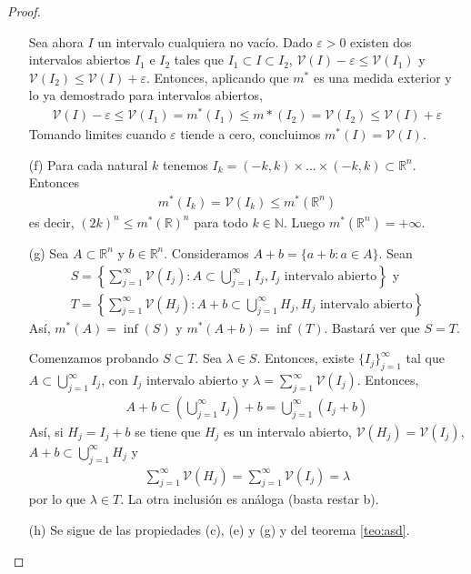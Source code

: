 \begin{proof}
\begin{enumerate}
        Sea ahora $I$ un intervalo cualquiera no vacío. Dado $\varepsilon > 0$ existen dos intervalos abiertos $I_1$ e $I_2$ tales que $I_1 \subset I \subset I_2$, $\mathcal{V}(I) - \varepsilon \leq \mathcal{V}(I_1)$ y $\mathcal{V}(I_2) \leq \mathcal{V}(I) + \varepsilon$. Entonces, aplicando que $m^*$ es una medida exterior y lo ya demostrado para intervalos abiertos,
              \begin{align*}
                  \mathcal{V}(I) - \varepsilon \leq \mathcal{V}(I_1) = m^*(I_1) \leq m*(I_2) = \mathcal{V}(I_2) \leq \mathcal{V}(I) + \varepsilon
              \end{align*}
              Tomando limites cuando $\varepsilon$ tiende a cero, concluimos $m^*(I) = \mathcal{V}(I)$.
        \item[(f)] Para cada natural $k$ tenemos $I_k = (-k,k) \times ... \times (-k,k) \subset \mathbb{R}^n$. Entonces
              \begin{align*}
                  m^*(I_k) = \mathcal{V}(I_k) \leq m^*(\mathbb{R}^n)
              \end{align*}
              es decir, $(2k)^n \leq m^*(\mathbb{R})^n$ para todo $k \in \mathbb{N}$. Luego $m^*(\mathbb{R}^n) = +\infty$.
        \item[(g)] Sea $A \subset \mathbb{R}^n$ y $b \in \mathbb{R}^n$. Consideramos $A + b = \{ a + b : a \in A\}$. Sean
              \begin{align*}
                  S = \left\{  \sum_{j=1}^{\infty}{\mathcal{V}(I_j)} : A \subset \bigcup_{j=1}^{\infty}{I_j}, I_j \text{ intervalo abierto}\right\} \text{ y } \\
                  T = \left\{  \sum_{j=1}^{\infty}{\mathcal{V}(H_j)} : A + b \subset \bigcup_{j=1}^{\infty}{H_j}, H_j \text{ intervalo abierto}\right\}
              \end{align*}
              Así, $m^*(A) = \inf(S)$ y $m^*(A + b) = \inf(T)$. Bastará ver que $S = T$.

              Comenzamos probando $S \subset T$. Sea $\lambda \in S$. Entonces, existe $\{ I_j \}_{j=1}^{\infty}$ tal que $A \subset \bigcup_{j=1}^{\infty}{I_j}$, con $I_j$ intervalo abierto y $\lambda = \sum_{j=1}^{\infty}{\mathcal{V}(I_j)}$. Entonces,
              \begin{align*}
                  A + b \subset \left( \bigcup_{j=1}^{\infty}{I_j} \right) + b =  \bigcup_{j=1}^{\infty}{(I_j + b)}
              \end{align*}
              Así, si $H_j = I_j + b$ se tiene que $H_j$ es un intervalo abierto, $\mathcal{V}(H_j) = \mathcal{V}(I_j)$, $A + b \subset \bigcup_{j=1}^{\infty}{H_j}$ y
              \begin{align*}
                  \sum_{j=1}^{\infty}{\mathcal{V}(H_j)} = \sum_{j=1}^{\infty}{\mathcal{V}(I_j)} = \lambda
              \end{align*}
              por lo que $\lambda \in T$. La otra inclusión es análoga (basta restar b).
        \item[(h)] Se sigue de las propiedades (c), (e) y (g) y del teorema \ref{teo:asd}.
    \end{enumerate}
\end{proof}

